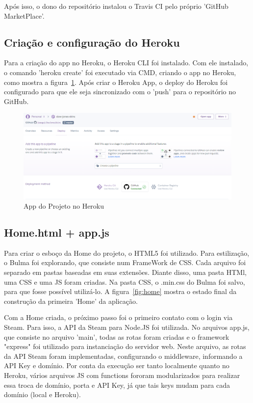 Após isso, o dono do repositório instalou o Travis CI pelo próprio 'GitHub MarketPlace'.

\subsection{Criação e configuração do Heroku}
Para a criação do app no Heroku, o Heroku CLI foi instalado. Com ele instalado, o comando
'heroku create' foi executado via CMD, criando o app no Heroku, como mostra a figura~\ref{fig:heroku}. Após criar o Heroku App, o deploy do Heroku foi configurado
para que ele seja sincronizado com o 'push' para o repositório no GitHub.\\
\begin{figure}[!htb]
	\centering
	\includegraphics[scale=0.5]{Imagens/Heroku.png}
	\caption{App do Projeto no Heroku}
	\label{fig:heroku}
\end{figure}

\subsection{Home.html + app.js}
Para criar o esboço da Home do projeto, o HTML5 foi utilizado. Para estilização, o Bulma foi explorando,
que consiste num FrameWork de CSS. Cada arquivo foi separado em pastas baseadas em suas extensões. 
Diante disso, uma pasta HTMl, uma CSS e uma JS foram criadas. Na pasta CSS, o .min.css do Bulma foi salvo, para que fosse possível utilizá-lo. A figura~\ref{fig:home} mostra o estado final da construção da primeira 'Home' da aplicação.

Com a Home criada, o próximo passo foi o primeiro contato com o login via Steam. Para isso, a API
da Steam para Node.JS foi utilizada. No arquivos app.js, que consiste no arquivo 'main', todas as rotas foram criadas
e o framework "express" foi utilizado para instanciação do servidor web. Neste arquivo, as rotas da API Steam foram implementadas, configurando
o middleware, informando a API Key e domínio. Por conta da execução ser tanto localmente quanto no Heroku, 
vários arquivos JS com functions fororam modularizados para realizar essa troca de domínio, porta e API Key, já que tais keys mudam para cada domínio (local e Heroku). 

